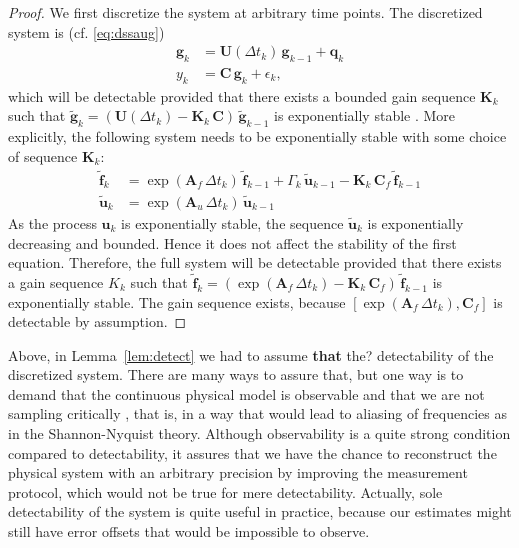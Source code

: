 \documentclass[journal]{IEEEtran}
\newcommand{\mauricio}[1]{{\color{blue}#1}}
\begin{document}
\begin{proof}
We first discretize the system at arbitrary time points. The discretized system is (cf. \eqref{eq:dssaug})
%
\begin{equation}
\begin{split}
   \mathbf{g}_k &= \mathbf{U}(\Delta t_k) \, \mathbf{g}_{k-1} +  \mathbf{q}_k \\
  y_k &=  \mathbf{C} \,  \mathbf{g}_k + \epsilon_k,
\end{split}
\end{equation}
%
which will be detectable provided that there exists a bounded gain sequence $\mathbf{K}_k$ such that $\tilde{\mathbf{g}}_k = (\mathbf{U}(\Delta t_k) - \mathbf{K}_k \, \mathbf{C}) \, \tilde{\mathbf{g}}_{k-1}$ is exponentially stable \cite{Anderson:1981}. More explicitly, the following system needs to be exponentially stable with some choice of sequence $\mathbf{K}_k$:
%
\begin{equation}
\begin{split}
  \tilde{\mathbf{f}}_k &= \exp(\mathbf{A}_f \, \Delta t_k) \, \tilde{\mathbf{f}}_{k-1}
  + \Gamma_k \, \tilde{\mathbf{u}}_{k-1} - \mathbf{K}_k \, \mathbf{C}_f \, \tilde{\mathbf{f}}_{k-1} \\
  \tilde{\mathbf{u}}_k &= \exp(\mathbf{A}_u \, \Delta t_k) \, \tilde{\mathbf{u}}_{k-1} 
\end{split}
\end{equation}
%
As the process $\mathbf{u}_k$ is exponentially stable, the sequence $\tilde{\mathbf{u}}_k$ is exponentially decreasing and bounded. Hence it does not affect the stability of the first equation. Therefore, the full system will be detectable provided that there exists a gain sequence $K_k$ such that $\tilde{\mathbf{f}}_k = (\exp(\mathbf{A}_f \, \Delta t_k) - \mathbf{K}_k \, \mathbf{C}_f) \, \tilde{\mathbf{f}}_{k-1}$ is exponentially stable. The gain sequence exists, because $[\exp(\mathbf{A}_f \, \Delta t_k),\mathbf{C}_f]$ is detectable by assumption. 
\end{proof}

Above, in Lemma~\ref{lem:detect} we had to assume \mauricio{\textbf{that} the?} detectability of the discretized system. There are many ways to assure that, but one way is to demand that the continuous physical model is observable and that we are not sampling critically \cite{Ding:2009}, that is, in a way that would lead to aliasing of frequencies as in the Shannon-Nyquist theory. Although observability is a quite strong condition compared to detectability, it assures that we have the chance to reconstruct the physical system with an arbitrary precision by improving the measurement protocol, which would not be true for mere detectability. Actually, sole detectability of the system is quite useful in practice, because our estimates might still have error offsets that would be impossible to observe.
\end{document}
